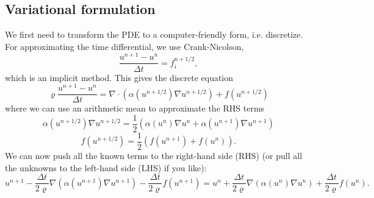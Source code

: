 \documentclass[norsk,a4paper,12pt]{article}
\begin{document}
\subsection{Variational formulation}
We first need to transform the PDE to a computer-friendly form, i.e. discretize. For approximating the time differential, we use Crank-Nicolson,
\begin{equation}
\frac{u^{n+1}-u^n}{\Delta t}=f_i^{n+1/2},
\end{equation}
which is an implicit method. This gives the discrete equation
\begin{equation}
\varrho\frac{u^{n+1}-u^n}{\Delta t}=\nabla\cdot(\alpha (u^{n+1/2})\nabla u^{n+1/2}) + f(u^{n+1/2})
\end{equation}
where we can use an arithmetic mean to approximate the RHS terms
\begin{equation}
\alpha (u^{n+1/2})\nabla u^{n+1/2} = \frac{1}{2}(\alpha (u^{n})\nabla u^{n}+\alpha (u^{n+1})\nabla u^{n+1})
\end{equation}
\begin{equation}
f(u^{n+1/2})=\frac{1}{2}(f(u^{n+1})+f(u^n)).
\end{equation}
We can now push all the known terms to the right-hand side (RHS) (or pull all the unknowns to the left-hand side (LHS) if you like):
\begin{equation*}
u^{n+1}-\frac{\Delta t}{2\varrho}\nabla(\alpha (u^{n+1})\nabla u^{n+1})-\frac{\Delta t}{2\varrho}f(u^{n+1})= u^{n}+\frac{\Delta t}{2\varrho}\nabla(\alpha (u^{n})\nabla u^{n})+\frac{\Delta t}{2\varrho}f(u^{n}).
\end{equation*}
\end{document}
